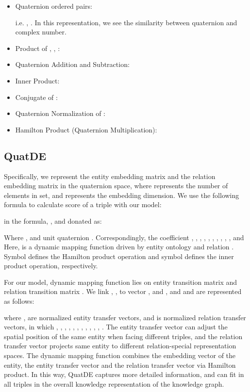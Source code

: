 \documentclass[letterpaper]{article} \usepackage{aaai20}  \usepackage{times}  \usepackage{helvet} \usepackage{courier}  \usepackage[hyphens]{url}  \usepackage{graphicx} \usepackage{lineno,hyperref,amsmath,amssymb}
\begin{document}
\begin{itemize}

\item Quaternion ordered pairs:

i.e. , . In this representation, we see the similarity between quaternion and complex number.

\item Product of , , :



\item Quaternion Addition and Subtraction:



\item Inner Product:



\item Conjugate  of :



\item Quaternion Normalization  of :



\item Hamilton Product (Quaternion Multiplication):



\end{itemize}

\subsection{QuatDE}

Specifically, we represent the entity embedding matrix  and the relation embedding matrix  in the quaternion space, where  represents the number of elements in set, and  represents the embedding dimension. We use the following formula to calculate score of a triple  with our model:

in the formula, ,  and  donated as:

Where ,  and unit quaternion . Correspondingly, the coefficient , , , , , , , , , ,  and   Here,  is a dynamic mapping function driven by entity ontology  and relation . Symbol  defines the Hamilton product operation and symbol  defines the inner product operation, respectively.

For our model, dynamic mapping function lies on entity transition matrix  and relation transition matrix . We link , ,  to vector ,  and , and  and  are represented as follows:

where ,  are normalized entity transfer vectors, and  is normalized relation transfer vectors, in which , , , , , , , , , , , . The entity transfer vector  can adjust the spatial position of the same entity  when facing different triples, and the relation transfer vector  projects same entity to different relation-special representation spaces. The dynamic mapping function  combines the embedding vector of the entity, the entity transfer vector and the relation transfer vector via Hamilton product. In this way, QuatDE captures more detailed information, and can fit in all triples in the overall knowledge representation of the knowledge graph.
\end{document}
